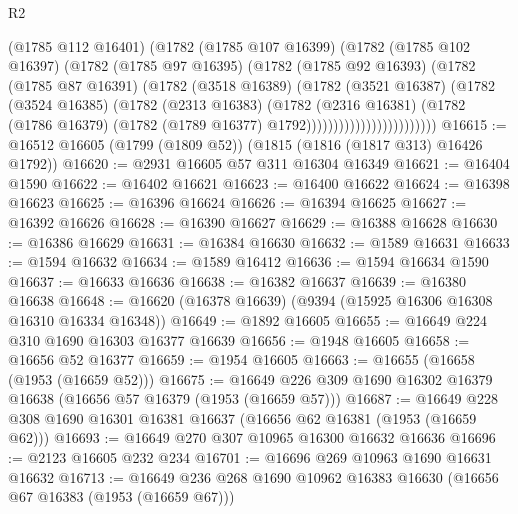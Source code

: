 \begin{lexlean}{R2}
\begin{coremodule}
                            (@1785 @112 @16401)
                            (@1782
                              (@1785 @107 @16399)
                              (@1782
                                (@1785 @102 @16397)
                                (@1782
                                  (@1785 @97 @16395)
                                  (@1782
                                    (@1785 @92 @16393)
                                    (@1782
                                      (@1785 @87 @16391)
                                      (@1782
                                        (@3518 @16389)
                                        (@1782
                                          (@3521 @16387)
                                          (@1782
                                            (@3524 @16385)
                                            (@1782
                                              (@2313 @16383)
                                              (@1782
                                                (@2316 @16381)
                                                (@1782
                                                  (@1786 @16379)
                                                  (@1782
                                                    (@1789 @16377)
                                                    @1792))))))))))))))))))))))))
@16615 := @16512 @16605 (@1799 (@1809 @52)) (@1815 (@1816 (@1817 @313) @16426 @1792))
@16620 := @2931 @16605 @57 @311 @16304 @16349
@16621 := @16404 @1590
@16622 := @16402 @16621
@16623 := @16400 @16622
@16624 := @16398 @16623
@16625 := @16396 @16624
@16626 := @16394 @16625
@16627 := @16392 @16626
@16628 := @16390 @16627
@16629 := @16388 @16628
@16630 := @16386 @16629
@16631 := @16384 @16630
@16632 := @1589 @16631
@16633 := @1594 @16632
@16634 := @1589 @16412
@16636 := @1594 @16634 @1590
@16637 := @16633 @16636
@16638 := @16382 @16637
@16639 := @16380 @16638
@16648 := @16620 (@16378 @16639) (@9394 (@15925 @16306 @16308 @16310 @16334 @16348))
@16649 := @1892 @16605
@16655 := @16649 @224 @310 @1690 @16303 @16377 @16639
@16656 := @1948 @16605
@16658 := @16656 @52 @16377
@16659 := @1954 @16605
@16663 := @16655 (@16658 (@1953 (@16659 @52)))
@16675 := @16649 @226 @309 @1690 @16302 @16379 @16638 (@16656 @57 @16379 (@1953 (@16659 @57)))
@16687 := @16649 @228 @308 @1690 @16301 @16381 @16637 (@16656 @62 @16381 (@1953 (@16659 @62)))
@16693 := @16649 @270 @307 @10965 @16300 @16632 @16636
@16696 := @2123 @16605 @232 @234
@16701 := @16696 @269 @10963 @1690 @16631 @16632
@16713 := @16649 @236 @268 @1690 @10962 @16383 @16630 (@16656 @67 @16383 (@1953 (@16659 @67)))

\end{coremodule}
\end{lexlean}
